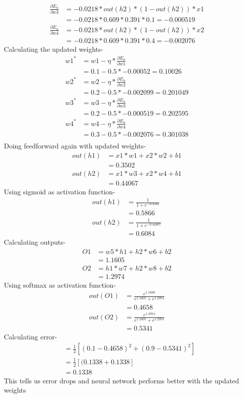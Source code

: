 \documentclass[12pt]{article}
\begin{document}
\begin{align*}
    \frac{\partial E_n}{\partial w3}
    &=-0.0218*out(h2)*(1-out(h2)) * x1\\
    &=-0.0218*0.609*0.391*0.1=-0.000519
\end{align*}
\begin{align*}
    \frac{\partial E_n}{\partial w4}
    &=-0.0218*out(h2)*(1-out(h2)) * x2\\
    &=-0.0218*0.609*0.391*0.4=-0.002076
\end{align*}
Calculating the updated weights-
\begin{align*}
    w1^{*}
    &=w1-\eta * \frac{\partial E_n}{\partial w1}\\
    &=0.1-0.5*-0.00052=0.10026\\
    w2^{*}
    &=w2-\eta * \frac{\partial E_n}{\partial w2}\\
    &=0.2-0.5*-0.002099=0.201049\\
    w3^{*}
    &=w3-\eta * \frac{\partial E_n}{\partial w3}\\
    &=0.2-0.5*-0.000519=0.202595\\
    w4^{*}
    &=w4-\eta * \frac{\partial E_n}{\partial w4}\\
    &=0.3-0.5*-0.002076=0.301038\\
\end{align*}
Doing feedforward again with updated weights-
\begin{align*}
    out(h1)
    &=x1 * w1 + x2 * w2 +b1\\
    &=0.3502\\
    out(h2)
    &= x1 * w3 + x2 * w4 +b1 \\
    &=0.44067
\end{align*}
Using sigmoid as activation function-
\begin{align*}
    out(h1)
    &=\frac{1}{1+e^{-0.3502}} \\
    &=0.5866\\
    out(h2)
    &=\frac{1}{1+e^{-0.44067}}\\
    &=0.6084
\end{align*}
Calculating outputs-
\begin{align*}
    O1
    &= w5*h1+h2*w6+b2 \\
    &=1.1605\\
    O2
    &= h1*w7+h2*w8+b2 \\
    &= 1.2974 
\end{align*}
Using softmax as activation function-
\begin{align*}
    out(O1)
    &=\frac{e^{1.1606}}{e^{1.1605}+e^{1.2974}} \\
    &=0.4658\\
    out(O2)
    &=\frac{e^{1.2974}}{e^{1.1605}+e^{1.2974}}\\
    &=0.5341
\end{align*}
Calculating error-
\begin{align*}
    &=\frac{1}{2}[(0.1-0.4658)^2 + (0.9-0.5341)^2]\\
    &=\frac{1}{2}[(0.1338+0.1338]\\
    &=0.1338 
\end{align*}
This tells us error drops and neural network performs better with the updated weights
\end{document}
